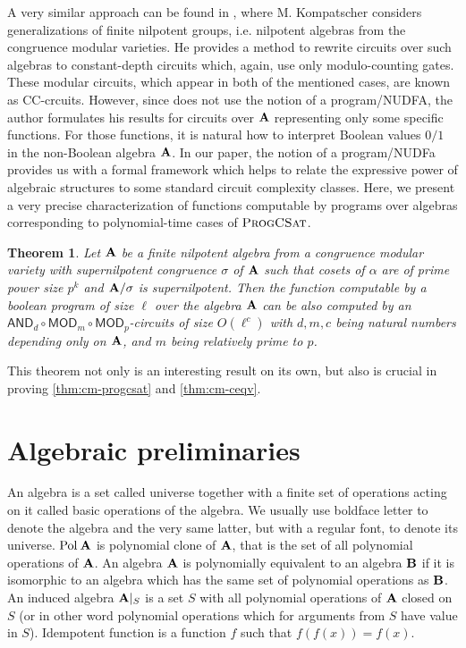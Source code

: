 \documentclass[11pt,a4paper]{amsart}
\newtheorem{thm}[lm]{Theorem}
\newcommand{\m}[1]{{\uppercase {\bf{#1}}}}
\newcommand{\pol}[1]{{\rm Pol\:\m #1}}
\newcounter{note}
\newcommand{\gProblem}[2]{\ensuremath{\operatorname{\textup{\textsc{{#2}}}}
		\ifthenelse{\equal{#1}{}}{}{\!\left( {#1} \right)}}}
\newcommand{\progcsat}[1]{\gProblem{#1}{ProgCSat}}
\newcommand{\ccand}{\mathsf{AND}}
\newcommand{\ccmod}{\mathsf{MOD}}
\begin{document}
A very similar approach can be found in \cite{Kompatscher19CC}, where M.\! Kompatscher considers generalizations of finite nilpotent groups, i.e.\! nilpotent algebras from the congruence modular varieties. He provides a method to rewrite circuits over such algebras to constant-depth circuits which, again, use only modulo-counting gates. These modular circuits, which appear in both of the mentioned cases, are known as CC-crcuits. However, since \cite{Kompatscher19CC} does not use the notion of a program/NUDFA, the author formulates his results for circuits over $\m A$ representing only some specific functions. For those functions, it is natural how to interpret Boolean values $0/1$ in the non-Boolean algebra $\m A$. In our paper, the notion of a program/NUDFa provides us with a formal framework which helps to relate the expressive power of algebraic structures to some standard circuit complexity classes. Here, we present a very precise characterization of functions computable by programs over algebras corresponding to polynomial-time cases of \progcsat{}.

\begin{thm}
\label{thm:2supernil-circuit-early}
Let $\m A$ be a finite nilpotent algebra from a congruence modular variety with  supernilpotent congruence $\sigma$ of $\m A$
such that cosets of $\alpha$ are of prime power size $p^{k}$ and  $\m A/\sigma$ is supernilpotent.
Then the function computable by a boolean program of size $\ell$ over the algebra $\m A$
can be also computed by an
$\ccand_d\circ\ccmod_{m}\circ\ccmod_p$-circuits of size $O(\ell^c)$
with $d,m,c$ being natural numbers depending only on $\m A$, and $m$ being relatively prime to $p$.
\end{thm}

This theorem not only is an interesting result on its own, but also is crucial in proving \cref{thm:cm-progcsat} and \ref{thm:cm-ceqv}. 


\section{Algebraic preliminaries}\label{sec-notions-1}
An algebra is a set called universe together with a finite set of operations acting on it called basic operations of the algebra. We usually use boldface letter to denote the algebra and the very same latter, but with a regular font, to denote its universe. $\pol{A}$ is polynomial clone of $\m A$, that is the set of all polynomial operations of $\m A$. An algebra $\m A$ is polynomially equivalent to an algebra $\m B$ if it is isomorphic
to an algebra which has the same set of polynomial operations as $\m B$.  An induced algebra $\m A|_S$ is a set $S$  with all polynomial operations of $\m A$ closed on $S$ (or in other word polynomial operations which for arguments from $S$ have value in $S$).  Idempotent  function is a function $f$ such that $f(f(x))=f(x)$.
\end{document}
